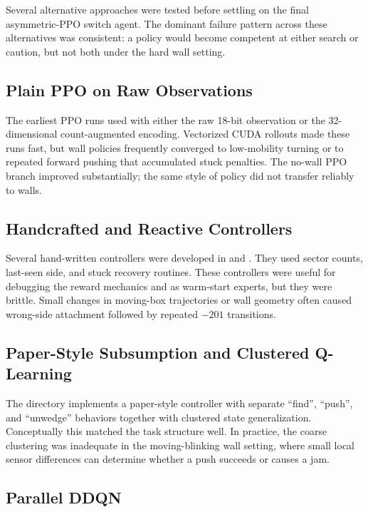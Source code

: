 \documentclass[11pt]{article}
\begin{document}
Several alternative approaches were tested before settling on the final asymmetric-PPO
switch agent. The dominant failure pattern across these alternatives was consistent: a
policy would become competent at either search or caution, but not both under the
hard wall setting.

\subsection{Plain PPO on Raw Observations}

The earliest PPO runs used  with either the raw 18-bit
observation or the 32-dimensional count-augmented encoding. Vectorized CUDA rollouts
made these runs fast, but wall policies frequently converged to low-mobility turning or
to repeated forward pushing that accumulated stuck penalties. The no-wall PPO branch
improved substantially; the same style of policy did not transfer reliably to walls.

\subsection{Handcrafted and Reactive Controllers}

Several hand-written controllers were developed in  and
. They used sector counts, last-seen side, and stuck recovery routines.
These controllers were useful for debugging the reward mechanics and as warm-start
experts, but they were brittle. Small changes in moving-box trajectories or wall
geometry often caused wrong-side attachment followed by repeated \(-201\) transitions.

\subsection{Paper-Style Subsumption and Clustered Q-Learning}

The  directory implements a paper-style controller with separate
``find'', ``push'', and ``unwedge'' behaviors together with clustered state
generalization. Conceptually this matched the task structure well. In practice, the
coarse clustering was inadequate in the moving-blinking wall setting, where small local
sensor differences can determine whether a push succeeds or causes a jam.

\subsection{Parallel DDQN}
\end{document}
